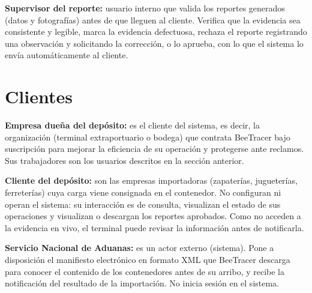 \textbf{Supervisor del reporte:} usuario interno que valida los reportes generados (datos y
fotografías) antes de que lleguen al cliente. Verifica que la evidencia sea consistente y legible,
marca la evidencia defectuosa, rechaza el reporte registrando una observación y solicitando la
corrección, o lo aprueba, con lo que el sistema lo envía automáticamente al cliente.

\section{Clientes}
\label{sec:clientes}

\textbf{Empresa dueña del depósito:} es el cliente del sistema, es decir, la organización
(terminal extraportuario o bodega) que contrata BeeTracer bajo suscripción para mejorar la
eficiencia de su operación y protegerse ante reclamos. Sus trabajadores son los usuarios descritos
en la sección anterior.

\textbf{Cliente del depósito:} son las empresas importadoras (zapaterías, jugueterías,
ferreterías) cuya carga viene consignada en el contenedor. No configuran ni operan el sistema: su
interacción es de consulta, visualizan el estado de sus operaciones y visualizan o descargan los
reportes aprobados. Como no acceden a la evidencia en vivo, el terminal puede revisar la
información antes de notificarla.

\textbf{Servicio Nacional de Aduanas:} es un actor externo (sistema). Pone a disposición el
manifiesto electrónico en formato XML que BeeTracer descarga para conocer el contenido de los
contenedores antes de su arribo, y recibe la notificación del resultado de la importación. No
inicia sesión en el sistema.
